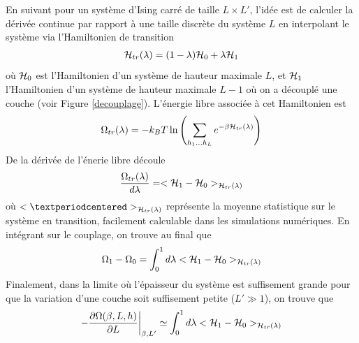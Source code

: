 En suivant \cite{vasilyev_monte_2007,cardozo_finite_2015} pour un système d'Ising carré de taille $L \times L'$, l'idée est de calculer la dérivée continue par rapport à une taille discrète du système $L$ en interpolant le système via l'Hamiltonien de transition
\begin{align}
    \mathcal{H}_{tr}(\lambda) = (1-\lambda) \mathcal{H}_0 + \lambda \mathcal{H}_1
    \label{hamil-trans}
\end{align}
où $\mathcal{H}_0$ est l'Hamiltonien d'un système de hauteur maximale $L$, et $\mathcal{H}_1$ l'Hamiltonien d'un système de hauteur maximale $L-1$ où on a découplé une couche (voir Figure \ref{decouplage}). L'énergie libre associée à cet Hamiltonien est
\begin{align}
    \Omega_{tr}(\lambda) = -k_B T \ln \left( \sum_{h_1 ... h_L} e^{-\beta \mathcal{H}_{tr}(\lambda)} \right)
\end{align}
De la dérivée de l'énerie libre découle
\begin{align}
    \frac{\Omega_{tr}(\lambda)}{d\lambda} = < \mathcal{H}_1 - \mathcal{H}_0>_{\mathcal{H}_{tr}(\lambda)}
\end{align}
où $< · >_{\mH_{tr}(\lambda)}$ représente la moyenne statistique sur le système en transition, facilement calculable dans les simulations numériques. En intégrant sur le couplage, on trouve au final que
\begin{align}
    \Omega_1 - \Omega_0 = \int_0^1 d\lambda  < \mathcal{H}_1 - \mathcal{H}_0>_{\mathcal{H}_{tr}(\lambda)}
\end{align}
Finalement, dans la limite où l'épaisseur du système est suffisement grande pour que la variation d'une couche soit suffisement petite ($L' \gg 1$), on trouve que
\begin{align}
   - \frac{\partial \Omega(\beta,L,h)}{\partial L} \bigg|_{\beta,L'} \simeq  \int_0^1 d\lambda  < \mathcal{H}_1 - \mathcal{H}_0>_{\mathcal{H}_{tr}(\lambda)}
\end{align}


